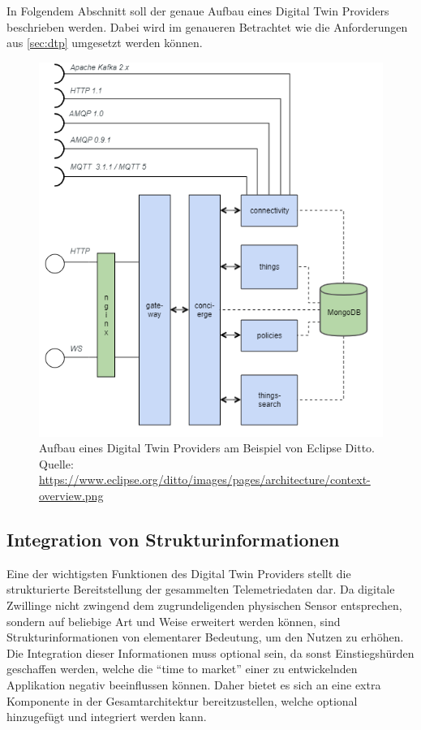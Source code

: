 In Folgendem Abschnitt soll der genaue Aufbau eines Digital Twin Providers beschrieben werden. Dabei wird im genaueren Betrachtet wie die Anforderungen aus \vref{sec:dtp} umgesetzt werden können.

\begin{figure}
    \centering
    \includegraphics[width=0.8\linewidth]{img/ditto_arch.png}
    \caption[Aufbau eines Digital Twin Providers]{Aufbau eines Digital Twin Providers am Beispiel von Eclipse Ditto.\\Quelle: \url{https://www.eclipse.org/ditto/images/pages/architecture/context-overview.png}}
    \label{fig:ditto_arch}
\end{figure}

\subsection*{Integration von Strukturinformationen}
Eine der wichtigsten Funktionen des Digital Twin Providers stellt die strukturierte Bereitstellung der gesammelten Telemetriedaten dar. Da digitale Zwillinge nicht zwingend dem zugrundeligenden physischen Sensor entsprechen, sondern auf beliebige Art und Weise erweitert werden können, sind Strukturinformationen von elementarer Bedeutung, um den Nutzen zu erhöhen. Die Integration dieser Informationen muss optional sein, da sonst Einstiegshürden geschaffen werden, welche die \enquote{time to market} einer zu entwickelnden Applikation negativ beeinflussen können. Daher bietet es sich an eine extra Komponente in der Gesamtarchitektur bereitzustellen, welche optional hinzugefügt und integriert werden kann.

